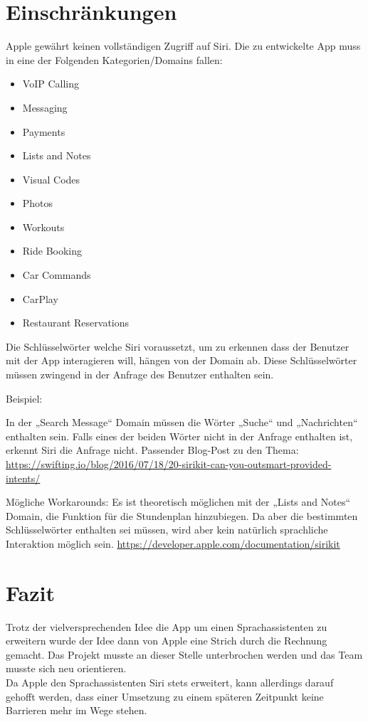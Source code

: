 \section{Einschränkungen}

Apple gewährt keinen vollständigen Zugriff auf Siri. Die zu entwickelte App muss in eine der Folgenden Kategorien/Domains fallen:
\begin{itemize}
\item VoIP Calling 
\item Messaging
\item Payments
\item Lists and Notes
\item Visual Codes
\item Photos
\item Workouts
\item Ride Booking
\item Car Commands
\item CarPlay
\item Restaurant Reservations
\end{itemize}

\newpage

Die Schlüsselwörter welche Siri voraussetzt, um zu erkennen dass der Benutzer mit der App interagieren will, hängen von der Domain ab.
Diese Schlüsselwörter müssen zwingend in der Anfrage des Benutzer enthalten sein. 

Beispiel: 

In der „Search Message“  Domain müssen die Wörter „Suche“ und „Nachrichten“ enthalten sein. Falls eines der beiden Wörter nicht in der Anfrage enthalten ist, erkennt Siri die Anfrage nicht.  \newline
Passender Blog-Post zu den Thema: \newline
\url{https://swifting.io/blog/2016/07/18/20-sirikit-can-you-outsmart-provided-intents/}

Mögliche Workarounds: \newline
Es ist theoretisch möglichen mit der „Lists and Notes“ Domain, die Funktion für die Stundenplan hinzubiegen. Da aber die bestimmten Schlüsselwörter enthalten sei müssen, wird aber kein natürlich sprachliche Interaktion möglich sein.
\url{https://developer.apple.com/documentation/sirikit}

\section{Fazit}
Trotz der vielversprechenden Idee die App um einen Sprachassistenten zu erweitern wurde der Idee dann von Apple eine Strich durch die Rechnung gemacht. Das Projekt musste an dieser Stelle unterbrochen werden und das Team musste sich neu orientieren.\\
Da Apple den Sprachassistenten Siri stets erweitert, kann allerdings darauf gehofft werden, dass einer Umsetzung zu einem späteren Zeitpunkt keine Barrieren mehr im Wege stehen.